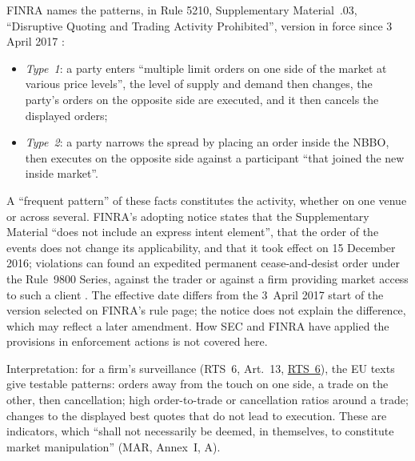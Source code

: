 \begin{qfrule}
FINRA names the patterns, in Rule 5210, Supplementary Material~.03, ``Disruptive Quoting and Trading Activity Prohibited'', version in force since 3 April 2017 \citep[Rule 5210.03]{finra-rules-2026}:
\begin{itemize}
\item \emph{Type~1}: a party enters ``multiple limit orders on one side of the market at various price levels'', the level of supply and demand then changes, the party's orders on the opposite side are executed, and it then cancels the displayed orders;
\item \emph{Type~2}: a party narrows the spread by placing an order inside the NBBO, then executes on the opposite side against a participant ``that joined the new inside market''.
\end{itemize}
A ``frequent pattern'' of these facts constitutes the activity, whether on one venue or across several. FINRA's adopting notice states that the Supplementary Material ``does not include an express intent element'', that the order of the events does not change its applicability, and that it took effect on 15 December 2016; violations can found an expedited permanent cease-and-desist order under the Rule~9800 Series, against the trader or against a firm providing market access to such a client \citep[Executive Summary; Background \& Discussion]{finra-rn-17-22}. The effective date differs from the 3~April 2017 start of the version selected on FINRA's rule page; the notice does not explain the difference, which may reflect a later amendment. How SEC and FINRA have applied the provisions in enforcement actions is not covered here.

 Interpretation: for a firm's surveillance (RTS~6, Art.~13, \hyperref[rule:mifid-rts6-algorithmic-controls]{RTS~6}), the EU texts give testable patterns: orders away from the touch on one side, a trade on the other, then cancellation; high order-to-trade or cancellation ratios around a trade; changes to the displayed best quotes that do not lead to execution. These are indicators, which ``shall not necessarily be deemed, in themselves, to constitute market manipulation'' (MAR, Annex~I, A).


\end{qfrule}
